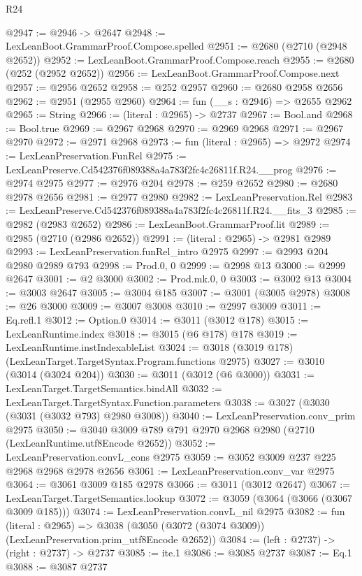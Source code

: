 \begin{lexlean}{R24}
\begin{coremodule}
@2947 := @2946 -> @2647
@2948 := LexLeanBoot.GrammarProof.Compose.spelled
@2951 := @2680 (@2710 (@2948 @2652))
@2952 := LexLeanBoot.GrammarProof.Compose.reach
@2955 := @2680 (@252 (@2952 @2652))
@2956 := LexLeanBoot.GrammarProof.Compose.next
@2957 := @2956 @2652
@2958 := @252 @2957
@2960 := @2680 @2958 @2656
@2962 := @2951 (@2955 @2960)
@2964 := fun (__s : @2946) => @2655 @2962
@2965 := String
@2966 := (literal : @2965) -> @2737
@2967 := Bool.and
@2968 := Bool.true
@2969 := @2967 @2968
@2970 := @2969 @2968
@2971 := @2967 @2970
@2972 := @2971 @2968
@2973 := fun (literal : @2965) => @2972
@2974 := LexLeanPreservation.FunRel
@2975 := LexLeanPreserve.Cd542376f089388a4a783f2fc4c26811f.R24.__prog
@2976 := @2974 @2975
@2977 := @2976 @204
@2978 := @259 @2652
@2980 := @2680 @2978 @2656
@2981 := @2977 @2980
@2982 := LexLeanPreservation.Rel
@2983 := LexLeanPreserve.Cd542376f089388a4a783f2fc4c26811f.R24.__fits_3
@2985 := @2982 (@2983 @2652)
@2986 := LexLeanBoot.GrammarProof.lit
@2989 := @2985 (@2710 (@2986 @2652))
@2991 := (literal : @2965) -> @2981 @2989
@2993 := LexLeanPreservation.funRel_intro @2975
@2997 := @2993 @204 @2980 @2989 @793
@2998 := Prod.{0, 0}
@2999 := @2998 @13
@3000 := @2999 @2647
@3001 := @2 @3000
@3002 := Prod.mk.{0, 0}
@3003 := @3002 @13
@3004 := @3003 @2647
@3005 := @3004 @185
@3007 := @3001 (@3005 @2978)
@3008 := @26 @3000
@3009 := @3007 @3008
@3010 := @2997 @3009
@3011 := Eq.refl.{1}
@3012 := Option.{0}
@3014 := @3011 (@3012 @178)
@3015 := LexLeanRuntime.index
@3018 := @3015 (@6 @178) @178
@3019 := LexLeanRuntime.instIndexableList
@3024 := @3018 (@3019 @178) (LexLeanTarget.TargetSyntax.Program.functions @2975)
@3027 := @3010 (@3014 (@3024 @204))
@3030 := @3011 (@3012 (@6 @3000))
@3031 := LexLeanTarget.TargetSemantics.bindAll
@3032 := LexLeanTarget.TargetSyntax.Function.parameters
@3038 := @3027 (@3030 (@3031 (@3032 @793) @2980 @3008))
@3040 := LexLeanPreservation.conv_prim @2975
@3050 := @3040 @3009 @789 @791 @2970 @2968 @2980 (@2710 (LexLeanRuntime.utf8Encode @2652))
@3052 := LexLeanPreservation.convL_cons @2975
@3059 := @3052 @3009 @237 @225 @2968 @2968 @2978 @2656
@3061 := LexLeanPreservation.conv_var @2975
@3064 := @3061 @3009 @185 @2978
@3066 := @3011 (@3012 @2647)
@3067 := LexLeanTarget.TargetSemantics.lookup
@3072 := @3059 (@3064 (@3066 (@3067 @3009 @185)))
@3074 := LexLeanPreservation.convL_nil @2975
@3082 := fun (literal : @2965) =>
  @3038 (@3050 (@3072 (@3074 @3009)) (LexLeanPreservation.prim_utf8Encode @2652))
@3084 := (left : @2737) -> (right : @2737) -> @2737
@3085 := ite.{1}
@3086 := @3085 @2737
@3087 := Eq.{1}
@3088 := @3087 @2737

\end{coremodule}
\end{lexlean}
